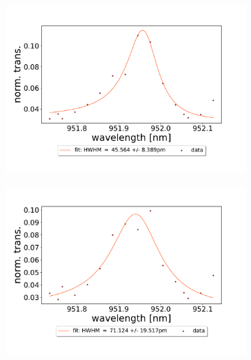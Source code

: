\begin{figure}[h!]
\begin{subfigure}[b]{0.49\textwidth}
        \includegraphics[width=\textwidth]{figures/results/double fano fits/20250326/33um_M3:M5_fit_11.pdf}
        \caption{}
        \label{fig:33um_M3:M5_fit_11}
    \end{subfigure}
    \begin{subfigure}[b]{0.49\textwidth}
        \includegraphics[width=\textwidth]{figures/results/double fano fits/20250326/33um_M3:M5_fit_12.pdf}
        \caption{}
        \label{fig:33um_M3:M5_fit_12}
    \end{subfigure}
\end{figure}
